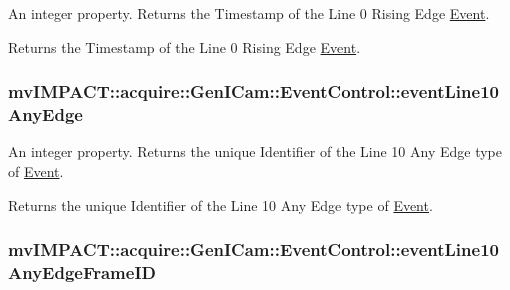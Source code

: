 An integer property. Returns the Timestamp of the Line 0 Rising Edge \hyperlink{classmv_i_m_p_a_c_t_1_1acquire_1_1_event}{Event}. 

Returns the Timestamp of the Line 0 Rising Edge \hyperlink{classmv_i_m_p_a_c_t_1_1acquire_1_1_event}{Event}. \hypertarget{classmv_i_m_p_a_c_t_1_1acquire_1_1_gen_i_cam_1_1_event_control_a1235b89ce22e9b1938d3593d537fc31b}{
\subsubsection[{event\+Line10\+Any\+Edge}]{ mv\+I\+M\+P\+A\+C\+T\+::acquire\+::\+Gen\+I\+Cam\+::\+Event\+Control\+::event\+Line10\+Any\+Edge}}\label{classmv_i_m_p_a_c_t_1_1acquire_1_1_gen_i_cam_1_1_event_control_a1235b89ce22e9b1938d3593d537fc31b}


An integer property. Returns the unique Identifier of the Line 10 Any Edge type of \hyperlink{classmv_i_m_p_a_c_t_1_1acquire_1_1_event}{Event}. 

Returns the unique Identifier of the Line 10 Any Edge type of \hyperlink{classmv_i_m_p_a_c_t_1_1acquire_1_1_event}{Event}. \hypertarget{classmv_i_m_p_a_c_t_1_1acquire_1_1_gen_i_cam_1_1_event_control_ae0c9ca772b6fcbb377b3ab07d7487559}{
\subsubsection[{event\+Line10\+Any\+Edge\+Frame\+I\+D}]{ mv\+I\+M\+P\+A\+C\+T\+::acquire\+::\+Gen\+I\+Cam\+::\+Event\+Control\+::event\+Line10\+Any\+Edge\+Frame\+I\+D}}\label{classmv_i_m_p_a_c_t_1_1acquire_1_1_gen_i_cam_1_1_event_control_ae0c9ca772b6fcbb377b3ab07d7487559}


